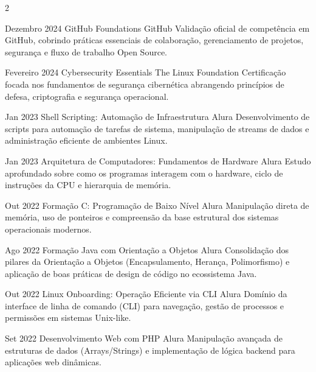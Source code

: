 \documentclass[10pt, a4paper]{article}
\begin{document}
\begin{paracol}{2}
\begin{rightcolumn}

\cvevent
  {Dezembro 2024}
  {GitHub Foundations}
  {GitHub}
  {Validação oficial de competência em GitHub, cobrindo práticas
  essenciais de colaboração, gerenciamento de projetos, segurança e
  fluxo de trabalho Open Source.}
  {}

\vspace{10pt}

\cvevent
  {Fevereiro 2024}
  {Cybersecurity Essentials}
  {The Linux Foundation}
  {Certificação focada nos fundamentos de segurança cibernética
  abrangendo princípios de defesa, criptografia e segurança
  operacional.}
  {}

\vspace{10pt}

\cvevent
  {Jan 2023}
  {Shell Scripting: Automação de Infraestrutura}
  {Alura}
  {Desenvolvimento de scripts para automação de tarefas de sistema,
  manipulação de streams de dados e administração eficiente de ambientes
  Linux.}
  {}

\vspace{10pt}

\cvevent
  {Jan 2023}
  {Arquitetura de Computadores: Fundamentos de Hardware}
  {Alura}
  {Estudo aprofundado sobre como os programas interagem com o hardware,
  ciclo de instruções da CPU e hierarquia de memória.}
  {}

\vspace{10pt}

\cvevent
  {Out 2022}
  {Formação C: Programação de Baixo Nível}
  {Alura}
  {Manipulação direta de memória, uso de ponteiros e compreensão da base
  estrutural dos sistemas operacionais modernos.}
  {}

\vspace{10pt}

\cvevent
  {Ago 2022}
  {Formação Java com Orientação a Objetos}
  {Alura}
  {Consolidação dos pilares da Orientação a Objetos (Encapsulamento,
  Herança, Polimorfismo) e aplicação de boas práticas de design de
  código no ecossistema Java.}
  {}

\vspace{10pt}

\cvevent
  {Out 2022}
  {Linux Onboarding: Operação Eficiente via CLI}
  {Alura}
  {Domínio da interface de linha de comando (CLI) para navegação, gestão
  de processos e permissões em sistemas Unix-like.}
  {}

\vspace{10pt}

\cvevent
  {Set 2022}
  {Desenvolvimento Web com PHP}
  {Alura}
  {Manipulação avançada de estruturas de dados (Arrays/Strings) e
  implementação de lógica backend para aplicações web dinâmicas.}
  {}


\end{rightcolumn}
\end{paracol}
\end{document}
